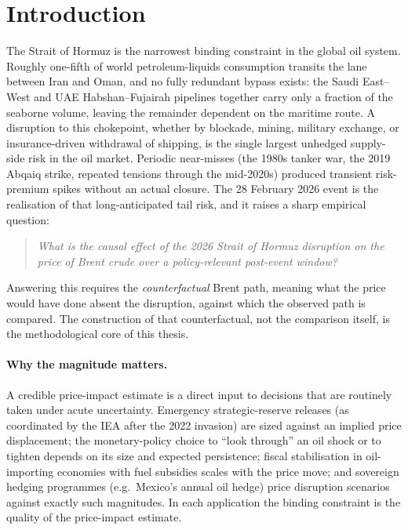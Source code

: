 \documentclass[11pt,a4paper]{article}
\begin{document}
\section{Introduction}
The Strait of Hormuz is the narrowest binding constraint in the global oil system.
Roughly one-fifth of world petroleum-liquids consumption transits the lane between
Iran and Oman, and no fully redundant bypass exists: the Saudi East--West and UAE
Habshan--Fujairah pipelines together carry only a fraction of the seaborne volume,
leaving the remainder dependent on the maritime route. A disruption to this chokepoint,
whether by blockade, mining, military exchange, or insurance-driven withdrawal of
shipping, is the single largest unhedged supply-side risk in the oil market. Periodic
near-misses (the 1980s tanker war, the 2019 Abqaiq strike, repeated tensions through
the mid-2020s) produced transient risk-premium spikes without an actual closure. The
28 February 2026 event is the realisation of that long-anticipated tail risk, and it
raises a sharp empirical question:

\begin{quote}
\emph{What is the causal effect of the 2026 Strait of Hormuz disruption on the price
of Brent crude over a policy-relevant post-event window?}
\end{quote}

Answering this requires the \emph{counterfactual} Brent path, meaning what the price
would have done absent the disruption, against which the observed path is compared. The
construction of that counterfactual, not the comparison itself, is the methodological
core of this thesis.

\paragraph{Why the magnitude matters.} A credible price-impact estimate is a direct
input to decisions that are routinely taken under acute uncertainty. Emergency
strategic-reserve releases (as coordinated by the IEA after the 2022 invasion) are
sized against an implied price displacement; the monetary-policy choice to ``look
through'' an oil shock or to tighten depends on its size and expected persistence;
fiscal stabilisation in oil-importing economies with fuel subsidies scales with the
price move; and sovereign hedging programmes (e.g.\ Mexico's annual oil hedge) price
disruption scenarios against exactly such magnitudes. In each application the binding
constraint is the quality of the price-impact estimate.
\end{document}
